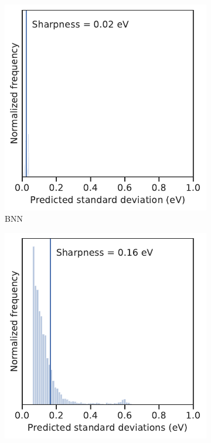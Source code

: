 \documentclass[]{achemso}
\begin{document}
\begin{figure}
\begin{subfigure}{0.32\textwidth}
        \includegraphics[width=\textwidth]{../BNN/sharpness.pdf}
        \caption{\gls{BNN}}\label{fig:sharpness_bnn}
    \end{subfigure}
    \begin{subfigure}{0.32\textwidth}
        \includegraphics[width=\textwidth]{../NNdNN/sharpness.pdf}

\end{subfigure}
\end{figure}
\end{document}
